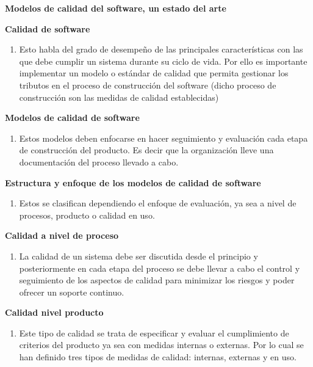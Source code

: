 \documentclass{article} %
\begin{document}


\noindent \textbf{Modelos de calidad del software, un estado del arte}

\noindent \textbf{Calidad de software}

\begin{enumerate}
\item \textbf{ }Esto habla del grado de desempe\~{n}o de las principales caracter\'{i}sticas con las que debe cumplir un sistema durante su ciclo de vida. Por ello es importante implementar un modelo o est\'{a}ndar de calidad que permita gestionar los tributos en el proceso de construcci\'{o}n del software (dicho proceso de construcci\'{o}n son las medidas de calidad establecidas)
\end{enumerate}

\noindent \textbf{Modelos de calidad de software}

\begin{enumerate}
\item \textbf{ }Estos modelos deben enfocarse en hacer seguimiento y evaluaci\'{o}n cada etapa de construcci\'{o}n del producto. Es decir que la organizaci\'{o}n lleve una documentaci\'{o}n del proceso llevado a cabo.
\end{enumerate}

\noindent \textbf{Estructura y enfoque de los modelos de calidad de software}

\begin{enumerate}
\item \textbf{ }Estos se clasifican dependiendo el enfoque de evaluaci\'{o}n, ya sea a nivel de procesos, producto o calidad en uso.
\end{enumerate}

\noindent \textbf{Calidad a nivel de proceso}

\begin{enumerate}
\item \textbf{ }La calidad de un sistema debe ser discutida desde el principio y posteriormente en cada etapa del proceso se debe llevar a cabo el control y seguimiento de los aspectos de calidad para minimizar los riesgos y poder ofrecer un soporte continuo.
\end{enumerate}

\noindent \textbf{Calidad nivel producto }

\begin{enumerate}
\item \textbf{ }Este tipo de calidad se trata de especificar y evaluar el cumplimiento de criterios del producto ya sea con medidas internas o externas. Por lo cual se han definido tres tipos de medidas de calidad: internas, externas y en uso.
\end{enumerate}
\end{document}
